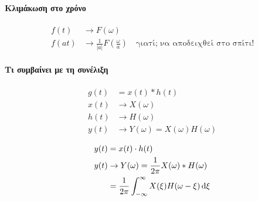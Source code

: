 \documentclass[11pt,a4paper,titlepage,fleqn]{article}
\begin{document}
	 \paragraph{Κλιμάκωση στο χρόνο}
	 \begin{align*}
	 f(t) &\to F(\omega )\\
	 f(at)&\to \frac{1}{|a|}F\left( \frac{\omega }{a} \right)
	 \quad \text{γιατί; να αποδειχθεί στο σπίτι!}
	 \end{align*}
	 
     \paragraph{Τι συμβαίνει με τη συνέλιξη}
     \begin{align*}
     g(t) &= x(t)*h(t) \\
     x(t)&\to X(\omega )\\
     h(t)&\to H(\omega )\\
     y(t)&\to Y(\omega) = X(\omega)H(\omega)
     \end{align*}
     
     \begin{align*}
     y(t) &= x(t)\cdot h(t)\\
     y(t) &\to Y(\omega) = \frac{1}{2\pi}X(\omega)*H(\omega )
     \\ &= \frac{1}{2\pi} \int_{-\infty}^{\infty} X(\xi)H(\omega-\xi)\dif\xi
     \end{align*}
     
    
\end{document}
